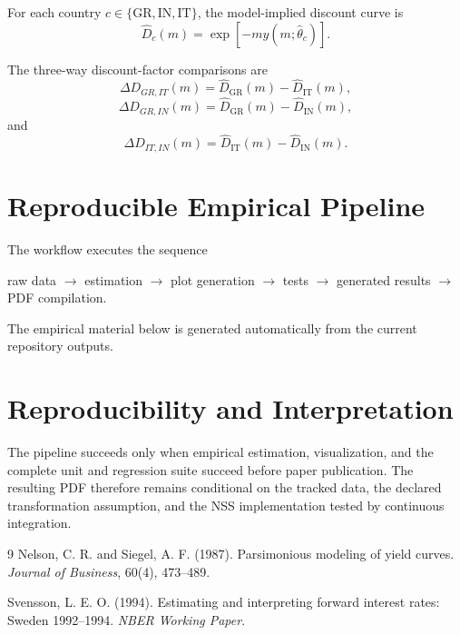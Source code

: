 \documentclass[12pt]{article}
\begin{document}
For each country $c\in\{\mathrm{GR},\mathrm{IN},\mathrm{IT}\}$, the model-implied discount curve is
\begin{equation}
\hat D_c(m)=\exp[-m y(m;\hat\theta_c)].
\end{equation}

The three-way discount-factor comparisons are
\begin{equation}
\Delta D_{GR,IT}(m)=\hat D_{\mathrm{GR}}(m)-\hat D_{\mathrm{IT}}(m),
\end{equation}
\begin{equation}
\Delta D_{GR,IN}(m)=\hat D_{\mathrm{GR}}(m)-\hat D_{\mathrm{IN}}(m),
\end{equation}
and
\begin{equation}
\Delta D_{IT,IN}(m)=\hat D_{\mathrm{IT}}(m)-\hat D_{\mathrm{IN}}(m).
\end{equation}

\section{Reproducible Empirical Pipeline}

The workflow executes the sequence
\begin{center}
raw data $\rightarrow$ estimation $\rightarrow$ plot generation $\rightarrow$ tests $\rightarrow$ generated results $\rightarrow$ PDF compilation.
\end{center}

The empirical material below is generated automatically from the current repository outputs.



\section{Reproducibility and Interpretation}

The pipeline succeeds only when empirical estimation, visualization, and the complete unit and regression suite succeed before paper publication. The resulting PDF therefore remains conditional on the tracked data, the declared transformation assumption, and the NSS implementation tested by continuous integration.

\begin{thebibliography}{9}
Nelson, C. R. and Siegel, A. F. (1987).
Parsimonious modeling of yield curves.
\emph{Journal of Business}, 60(4), 473--489.

Svensson, L. E. O. (1994).
Estimating and interpreting forward interest rates: Sweden 1992--1994.
\emph{NBER Working Paper}.
\end{thebibliography}
\end{document}
